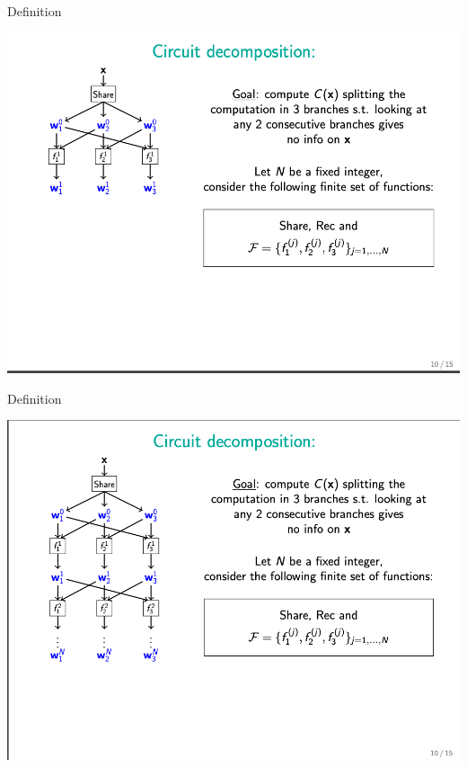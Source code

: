 \documentclass{beamer}
\begin{document}
\begin{frame}{Definition}
	\begin{minipage}{0.42\linewidth}
		\includegraphics[scale=0.4]{f14.png}
	\end{minipage}
\end{frame}


\begin{frame}{Definition}
	\begin{minipage}{0.42\linewidth}
		\includegraphics[scale=0.4]{f15.png}
	\end{minipage}
\end{frame}
\end{document}
